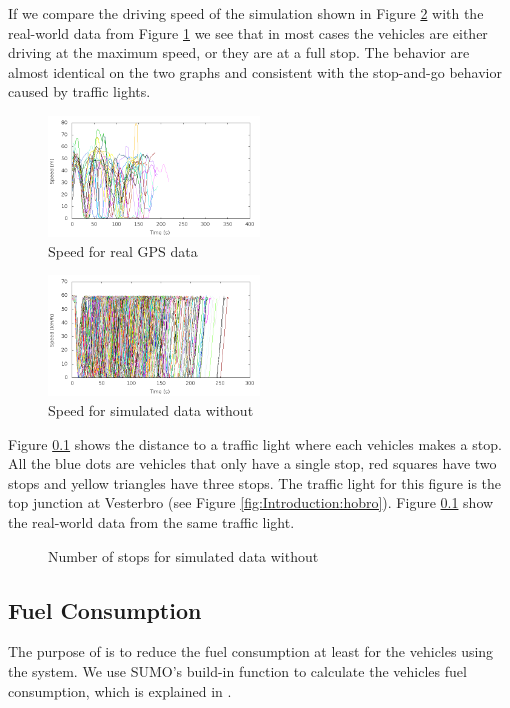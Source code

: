 If we compare the driving speed of the simulation shown in Figure \ref{fig:TestResults:speed0} with the real-world data from Figure \ref{fig:TestResults:RealSpeed} we see that in most cases the vehicles are either driving at the maximum speed, or they are at a full stop. 
The behavior are almost identical on the two graphs and consistent with the stop-and-go behavior caused by traffic lights. 

\begin{figure}[htb]
\includegraphics[width=0.5\textwidth]{../images/Real/RealSpeed.png}
\caption{Speed for real GPS data}
\label{fig:TestResults:RealSpeed}
\end{figure}
\begin{figure}[htb]
\includegraphics[width=0.5\textwidth]{../images/tp0/speedUncontrolled0.png}
\caption{Speed for simulated data without \tech}
\label{fig:TestResults:speed0}
\end{figure}

Figure \ref{} shows the distance to a traffic light where each vehicles makes a stop. 
All the blue dots are vehicles that only have a single stop, red squares have two stops and yellow triangles have three stops.
The traffic light for this figure is the top junction at Vesterbro (see Figure \ref{fig:Introduction:hobro}). 
Figure \ref{} show the real-world data from the same traffic light. 
\begin{figure}[htb]
\caption{Number of stops for simulated data without \tech}
\label{fig:TestResults:stop0}
\end{figure}


\subsection{Fuel Consumption}
The purpose of \tech is to reduce the fuel consumption at least for the vehicles using the system. 
We use SUMO's build-in function to calculate the vehicles fuel consumption, which is explained in \cite{SUMOFuel}.


